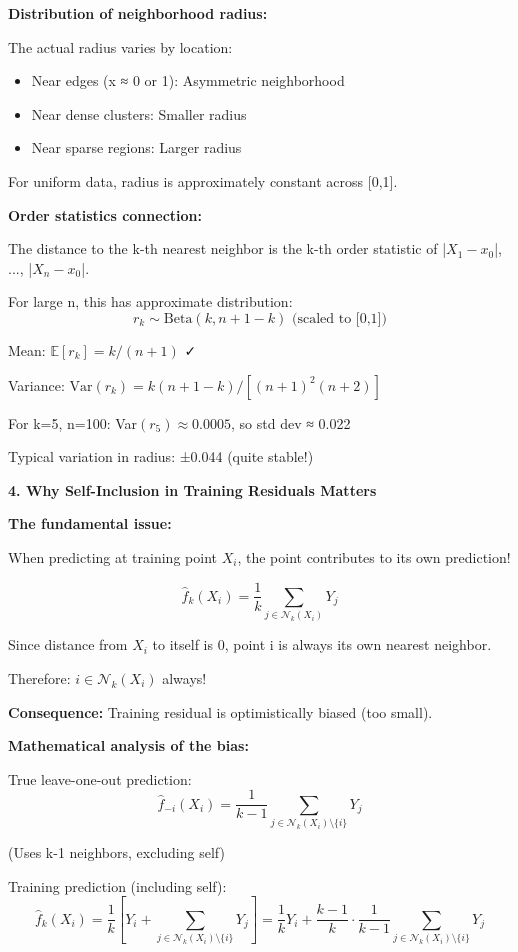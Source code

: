 \documentclass[12pt]{article}
\begin{document}
\begin{explanation}
\textbf{Distribution of neighborhood radius:}

The actual radius varies by location:
\begin{itemize}
    \item Near edges (x ≈ 0 or 1): Asymmetric neighborhood
    \item Near dense clusters: Smaller radius
    \item Near sparse regions: Larger radius
\end{itemize}

For uniform data, radius is approximately constant across [0,1].

\textbf{Order statistics connection:}

The distance to the k-th nearest neighbor is the k-th order statistic of {|$X_1 - x_0$|, ..., |$X_n - x_0$|}.

For large n, this has approximate distribution:
\[
r_k \sim \text{Beta}\left(k, n+1-k\right) \text{ (scaled to [0,1])}
\]

Mean: $\mathbb{E}[r_k] = k/(n+1)$ ✓

Variance: $\text{Var}(r_k) = k(n+1-k)/[(n+1)^2(n+2)]$

For k=5, n=100: Var$(r_5) \approx 0.0005$, so std dev ≈ 0.022

Typical variation in radius: ±0.044 (quite stable!)

\textbf{4. Why Self-Inclusion in Training Residuals Matters}

\textbf{The fundamental issue:}

When predicting at training point $X_i$, the point contributes to its own prediction!

\[
\hat{f}_k(X_i) = \frac{1}{k}\sum_{j \in \mathcal{N}_k(X_i)} Y_j
\]

Since distance from $X_i$ to itself is 0, point i is always its own nearest neighbor.

Therefore: $i \in \mathcal{N}_k(X_i)$ always!

\textbf{Consequence:} Training residual is optimistically biased (too small).

\textbf{Mathematical analysis of the bias:}

True leave-one-out prediction:
\[
\hat{f}_{-i}(X_i) = \frac{1}{k-1}\sum_{j \in \mathcal{N}_k(X_i) \setminus \{i\}} Y_j
\]

(Uses k-1 neighbors, excluding self)

Training prediction (including self):
\[
\hat{f}_k(X_i) = \frac{1}{k}\left[Y_i + \sum_{j \in \mathcal{N}_k(X_i) \setminus \{i\}} Y_j\right] = \frac{1}{k}Y_i + \frac{k-1}{k}\cdot\frac{1}{k-1}\sum_{j \in \mathcal{N}_k(X_i) \setminus \{i\}} Y_j
\]


\end{explanation}
\end{document}
